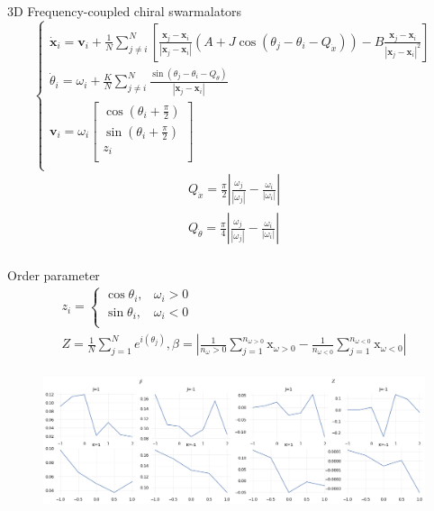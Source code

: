 \documentclass[10pt,aspectratio=43,mathserif,table]{beamer}
\begin{document}
\begin{frame}{3D Frequency-coupled chiral swarmalators}
    $$
    \begin{cases}
        \dot{\mathbf{x}}_i=\mathbf{v}_i+\frac{1}{N}\sum_{j\ne i}^N{\left[ \frac{\mathbf{x}_j-\mathbf{x}_i}{\left| \mathbf{x}_j-\mathbf{x}_i \right|}\left( A+J\cos \left( \theta _j-\theta _i-Q_{\dot{x}} \right) \right) -B\frac{\mathbf{x}_j-\mathbf{x}_i}{\left| \mathbf{x}_j-\mathbf{x}_i \right|^2} \right]}\\
        \dot{\theta}_i=\omega _i+\frac{K}{N}\sum_{j\ne i}^N{\frac{\sin \left( \theta _j-\theta _i-Q_{\dot{\theta}} \right)}{\left| \mathbf{x}_j-\mathbf{x}_i \right|}}\\
        \mathbf{v}_i=\omega _i\left[ \begin{array}{c}
        \cos \left( \theta _i+\frac{\pi}{2} \right)\\
        \sin \left( \theta _i+\frac{\pi}{2} \right)\\
        z_i\\
    \end{array} \right]\\
    \end{cases}
    $$
    $$
    \begin{array}{c}
        Q_{\dot{x}}=\frac{\pi}{2}\left| \frac{\omega _j}{\left| \omega _j \right|}-\frac{\omega _i}{\left| \omega _i \right|} \right|\\
        Q_{\dot{\theta}}=\frac{\pi}{4}\left| \frac{\omega _j}{\left| \omega _j \right|}-\frac{\omega _i}{\left| \omega _i \right|} \right|\\
    \end{array}
    $$
\end{frame}

\begin{frame}{Order parameter}
    $$
    \begin{array}{c}
        z_i=\begin{cases}
        \cos \theta _i,&		\omega _i>0\\
        \sin \theta _i,&		\omega _i<0\\
    \end{cases}\\
        Z=\frac{1}{N}\sum_{j=1}^N{e^{i\left( \theta _j \right)}},  \beta =\left| \frac{1}{n_{\omega}>0}\sum_{j=1}^{n_{\omega >0}}{\mathrm{x}_{\omega >0}}-\frac{1}{n_{\omega <0}}\sum_{j=1}^{n_{\omega <0}}{\mathrm{x}_{\omega <0}} \right|\\
    \end{array}
    $$
    \begin{figure}
        \centering
        \includegraphics[width=\textwidth]{1FCbetaZ.png}
    \end{figure}  
\end{frame}
\end{document}
